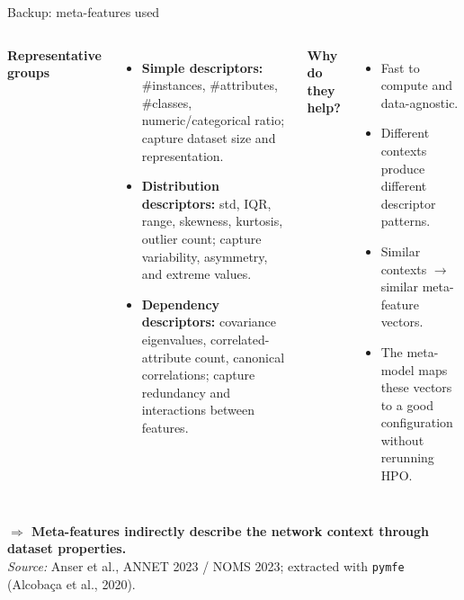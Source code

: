\begin{frame}[noframenumbering]{Backup: meta-features used}
	\small

	\begin{columns}[T,onlytextwidth]
		{\normalsize\textbf{Representative groups}}\\[0.1em]
		\begin{itemize}
			\footnotesize
			\setlength\itemsep{0.3em}
			\item \textbf{Simple descriptors:} \#instances, \#attributes, \#classes, numeric/categorical ratio; capture dataset size and representation.
			\item \textbf{Distribution descriptors:} std, IQR, range, skewness, kurtosis, outlier count; capture variability, asymmetry, and extreme values.
			\item \textbf{Dependency descriptors:} covariance eigenvalues, correlated-attribute count, canonical correlations; capture redundancy and interactions between features.
		\end{itemize}

		{\normalsize\textbf{Why do they help?}}\\[0.1em]
		\begin{itemize}
			\footnotesize
			\setlength\itemsep{0.3em}
			\item Fast to compute and data-agnostic.
			\item Different contexts produce different descriptor patterns.
			\item Similar contexts \(\rightarrow\) similar meta-feature vectors.
			\item The meta-model maps these vectors to a good configuration without rerunning HPO.
		\end{itemize}
	\end{columns}

	\vspace{0.15em}
	\centering
	\footnotesize\textbf{$\Longrightarrow$ Meta-features indirectly describe the network context through dataset properties.}\\[-0.02em]
	{\fontsize{6.3}{7.0}\selectfont\emph{Source:} Anser et al., ANNET 2023 / NOMS 2023; extracted with \texttt{pymfe} (Alcoba\c{c}a et al., 2020).}

\end{frame}
